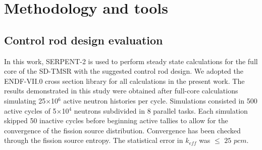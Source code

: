 \section{Methodology and tools} \label{Methodology-and-tools}
\subsection{Control rod design evaluation}
In this work, SERPENT-2 \cite{leppanen2014serpent} is used to 
perform steady state calculations for the full core of the SD-TMSR with 
the suggested control rod design. We adopted the ENDF-VII.0 cross section library 
for all calculations in the present work. The results demonstrated in this study were obtained after full-core calculations simulating 25$\times$10$^6$ active neutron histories per cycle. Simulations consisted in 500 active cycles of 5$\times$10$^4$ neutrons subdivided in 8 parallel tasks. Each simulation skipped 50 inactive cycles before beginning active tallies to allow for the convergence of the fission source distribution. Convergence has been checked through the fission source entropy. The statistical error in $k_{eff}$ was $\leq$ $25$ $pcm$.

%
%
%
%
%
%

